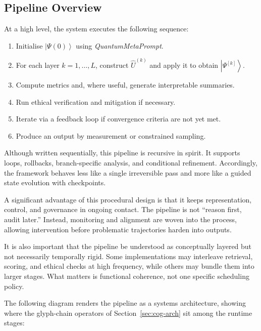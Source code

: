 \documentclass[12pt]{article}
\newcommand{\ket}[1]{\left|#1\right\rangle}
\begin{document}
\subsection{Pipeline Overview}
At a high level, the system executes the following sequence:
\begin{enumerate}[leftmargin=2em]
    \item Initialise $\ket{\Psi(0)}$ using \textit{QuantumMetaPrompt}.
    \item For each layer $k = 1, \dots, L$, construct $\hat{U}^{(k)}$ and apply it to obtain $\ket{\Psi^{[k]}}$.
    \item Compute metrics and, where useful, generate interpretable summaries.
    \item Run ethical verification and mitigation if necessary.
    \item Iterate via a feedback loop if convergence criteria are not yet met.
    \item Produce an output by measurement or constrained sampling.
\end{enumerate}

Although written sequentially, this pipeline is recursive in spirit. It supports loops, rollbacks, branch-specific analysis, and conditional refinement. Accordingly, the framework behaves less like a single irreversible pass and more like a guided state evolution with checkpoints.

A significant advantage of this procedural design is that it keeps representation, control, and governance in ongoing contact. The pipeline is not ``reason first, audit later.'' Instead, monitoring and alignment are woven into the process, allowing intervention before problematic trajectories harden into outputs.

It is also important that the pipeline be understood as conceptually layered but not necessarily temporally rigid. Some implementations may interleave retrieval, scoring, and ethical checks at high frequency, while others may bundle them into larger stages. What matters is functional coherence, not one specific scheduling policy.

The following diagram renders the pipeline as a systems architecture, showing where the glyph-chain operators of Section~\ref{sec:cog-arch} sit among the runtime stages:
\end{document}
